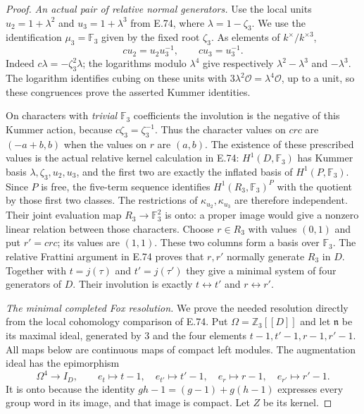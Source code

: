 \begin{proof}
\emph{An actual pair of relative normal generators.}
Use the local units $u_2=1+\lambda^2$ and
$u_3=1+\lambda^3$ from E.74, where
$\lambda=1-\zeta_3$. We use the identification
$\mu_3=\mathbb F_3$ given by the fixed root $\zeta_3$.
As elements of $k^\times/k^{\times3}$,
\[
 cu_2=u_2u_3^{-1},\qquad cu_3=u_3^{-1}.
 \tag{E75.9}
\]
Indeed $c\lambda=-\zeta_3^2\lambda$; the logarithms
modulo $\lambda^4$ give respectively
$\lambda^2-\lambda^3$ and $-\lambda^3$.
The logarithm identifies cubing on these units with
$3\lambda^2\mathcal O=\lambda^4\mathcal O$, up to a
unit, so these congruences prove the asserted Kummer
identities.

On characters with \emph{trivial} $\mathbb F_3$
coefficients the involution is the negative of
this Kummer action, because $c\zeta_3=\zeta_3^{-1}$.
Thus the character values on $cr c$ are
$(-a+b,b)$ when the values on $r$ are $(a,b)$.
The existence of these prescribed values is
the actual relative kernel calculation in
E.74: $H^1(D,\mathbb F_3)$ has Kummer basis
$\lambda,\zeta_3,u_2,u_3$, and the first
two are exactly the inflated basis of
$H^1(P,\mathbb F_3)$. Since $P$ is free,
the five-term sequence identifies
$H^1(R_3,\mathbb F_3)^P$ with the quotient
by those first two classes. The restrictions
of $\kappa_{u_2},\kappa_{u_3}$ are therefore
independent. Their joint evaluation map
$R_3\to\mathbb F_3^2$ is onto: a proper
image would give a nonzero linear relation
between those characters.
Choose $r\in R_3$ with values $(0,1)$ and put
$r'=cr c$; its values are $(1,1)$.
These two columns form a basis over $\mathbb F_3$.
The relative Frattini argument in E.74 proves that
$r,r'$ normally generate $R_3$ in $D$.
Together with $t=j(\tau)$ and $t'=j(\tau')$ they
give a minimal system of four generators of $D$.
Their involution is exactly
$t\leftrightarrow t'$ and $r\leftrightarrow r'$.

\emph{The minimal completed Fox resolution.}
We prove the needed resolution directly from the
local cohomology comparison of E.74. Put
$\Omega=\mathbb Z_3[[D]]$ and let $\mathfrak n$ be
its maximal ideal, generated by $3$ and the four
elements $t-1,t'-1,r-1,r'-1$. All maps below are
continuous maps of compact left modules. The
augmentation ideal has the epimorphism
\[
 \Omega^4\longrightarrow I_D,\qquad
 e_t\mapsto t-1,\quad e_{t'}\mapsto t'-1,\quad
 e_r\mapsto r-1,\quad e_{r'}\mapsto r'-1.
 \tag{E75.10}
\]
It is onto because the identity
$gh-1=(g-1)+g(h-1)$ expresses every group word
in its image, and that image is compact. Let $Z$
be its kernel.


\end{proof}
